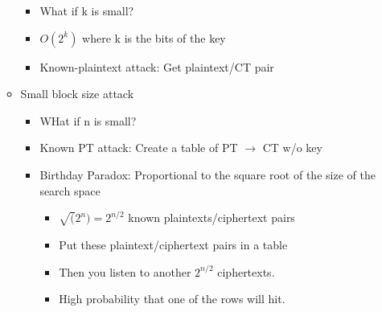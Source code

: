 \begin{itemize}
\begin{itemize}
        \begin{itemize}
        \item What if k is small?
        \item $O(2^k)$ where k is the bits of the key
        \item Known-plaintext attack: Get plaintext/CT pair
        \end{itemize}
    \item Small block size attack
        \begin{itemize}
        \item WHat if n is small?
        \item Known PT attack: Create a table of PT $\rightarrow$ CT w/o key
        \item Birthday Paradox: Proportional to the square root of the size of the search space
            \begin{itemize}
            \item $\sqrt(2^n) = 2^{n/2}$ known plaintexts/ciphertext pairs
            \item Put these plaintext/ciphertext pairs in a table
            \item Then you listen to another $2^{n/2}$ ciphertexts.
            \item High probability that one of the rows will hit. 
            \end{itemize}
        \end{itemize}
    \end{itemize}
\end{itemize}